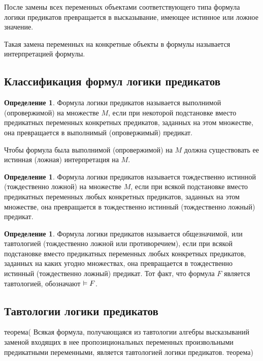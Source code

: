 \documentclass[letterpaper, 10pt]{article}
\theoremstyle{definition}
\newtheorem{define}[thm]{Определение}
\begin{document}
	После замены всех переменных объектами соответствующего типа формула логики
	предикатов превращается в высказывание, имеющее истинное или ложное
	значение.

	Такая замена переменных на конкретные объекты в формулы называется
	интерпретацией формулы.

	\subsection{Классификация формул логики предикатов}

	\begin{define}
		Формула логики предикатов называется выполнимой (опровержимой) на
		множестве $M$, если при некоторой подстановке вместо предикатных
		переменных конкретных предикатов, заданных на этом множестве, она
		превращается в выполнимый (опровержимый) предикат.
	\end{define}

	Чтобы формула была выполнимой (опровержимой) на $M$ должна существовать ее
	истинная (ложная) интерпретация на $M$.

	\begin{define}
		Формула логики предикатов называется тождественно истинной (тождественно
		ложной) на множестве $M$, если при всякой подстановке вместо предикатных
		переменных любых конкретных предикатов, заданных на этом множестве, она
		превращается в тождественно истинный (тождественно ложный) предикат.
	\end{define}

	\begin{define}
		Формула логики предикатов называется общезначимой, или тавтологией
		(тождественно ложной или противоречием), если при всякой подстановке
		вместо предикатных переменных любых конкретных предикатов, заданных на
		каких угодно множествах, она превращается в тождественно истинный
		(тождественно ложный) предикат. Тот факт, что формула $F$ является
		тавтологией, обозначают $\vDash F$.
	\end{define}

	\subsection{Тавтологии логики предикатов}
	
	теорема(
	Всякая формула, получающаяся из тавтологии алгебры высказываний заменой
	входящих в нее пропозициональных переменных произвольными предикатными
	переменными, является тавтологией логики предикатов.
	теорема)
\end{document}
